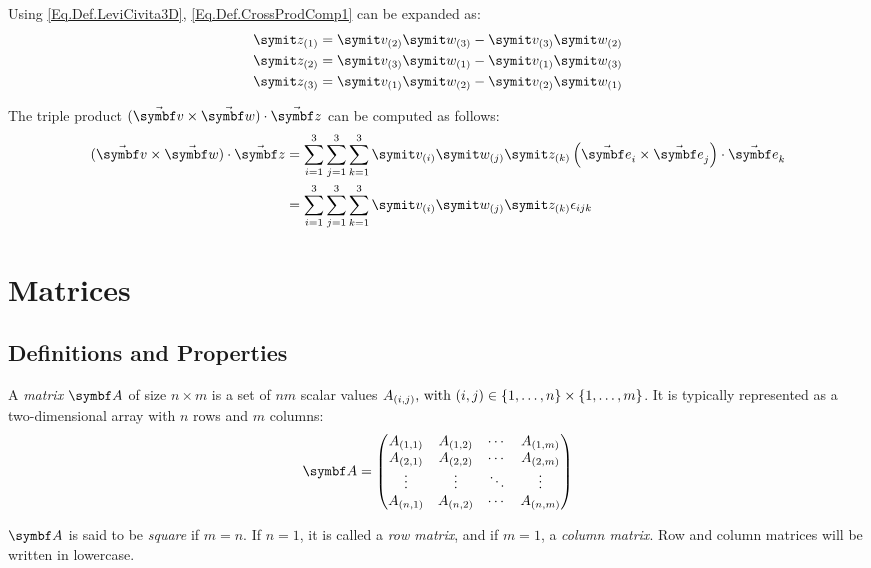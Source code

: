 Using \eqref{Eq.Def.LeviCivita3D}, \eqref{Eq.Def.CrossProdComp1} can be expanded as:
\begin{equation} \label{Eq.Def.CrossProdComp2}
\begin{split}
\cmp{z}{1} = \cmp{v}{2} \cmp{w}{3} - \cmp{v}{3} \cmp{w}{2} \\
\cmp{z}{2} = \cmp{v}{3} \cmp{w}{1} - \cmp{v}{1} \cmp{w}{3} \\
\cmp{z}{3} = \cmp{v}{1} \cmp{w}{2} - \cmp{v}{2} \cmp{w}{1}
\end{split}
\end{equation}

The triple product $(\vabs{v}\times\vabs{w})\cdot\vabs{z}$ can be computed as follows:
\begin{equation} \label{Eq.Def.TripleProdComp}
\begin{split}
(\vabs{v} \times \vabs{w})\cdot\vabs{z} &=\sum_{i=1}^{3}\sum_{j=1}^{3}\sum_{k=1}^{3} \cmp{v}{i} \cmp{w}{j} \cmp{z}{k} \rndp{\vasub{\bv}{i} \times \vasub{\bv}{j}} \cdot \vasub{\bv}{k} \\
&=\sum_{i=1}^{3}\sum_{j=1}^{3}\sum_{k=1}^{3} \cmp{v}{i} \cmp{w}{j} \cmp{z}{k} \epsilon_{ijk}
\end{split}
\end{equation}

\section{Matrices} %
\subsection{Definitions and Properties} %
A \emph{matrix} $\mat{A}$ of size $n \times m$ is a set of $nm$ scalar values $A_{(i,j)}\text{, with } (i,j)\in\{1,\dotsc,n\}\times\{1,\dotsc,m\}$. It is typically represented as a two-dimensional array with $n$ rows and $m$ columns:
\begin{equation} \label{Eq.Def.Matrix}
\mat{A}=
\matenv
{
\ind{A}{1,1} 	&\ind{A}{1,2}	&\cdots 	&\ind{A}{1,m}\\
\ind{A}{2,1} 	&\ind{A}{2,2}	&\cdots 	&\ind{A}{2,m}\\
\vdots 			&\vdots 		&\ddots 	&\vdots\\
\ind{A}{n,1} 	&\ind{A}{n,2}	&\cdots 	&\ind{A}{n,m}\\
}
\end{equation}

$\mat{A}$ is said to be \emph{square} if $m=n$. If $n=1$, it is called a \emph{row matrix}, and if $m=1$, a \emph{column matrix}. Row and column matrices will be written in lowercase.

